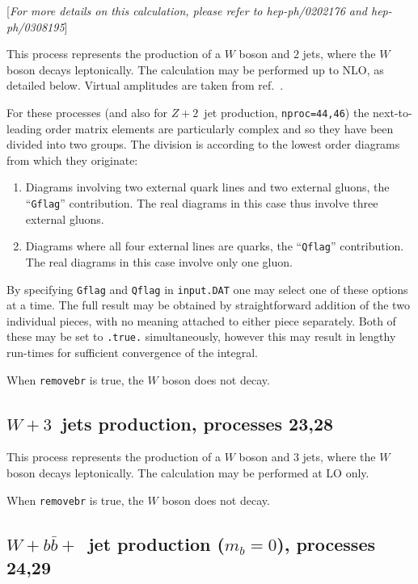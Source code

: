 \documentclass{article}
\begin{document}
\begin{center}
[{\it For more details on this calculation, please refer to \break
 hep-ph/0202176 and hep-ph/0308195}]
\end{center}
This process represents the production of a $W$ boson and $2$ jets,
where the $W$ boson decays leptonically. The calculation may be
performed up to NLO, as detailed below. Virtual amplitudes are
taken from ref.~\cite{Bern:1997sc}.

For these processes (and also for $Z+2$~jet production, {\tt nproc=44,46})
the next-to-leading order matrix elements are
particularly complex and so they have been divided into two groups.
The division is according to the lowest order diagrams from which they
originate:
\begin{enumerate}
\item Diagrams involving two external quark lines and two external gluons,
the ``{\tt Gflag}'' contribution. The real diagrams in this case thus
involve three external gluons.

\item Diagrams where all four external lines are quarks,
the ``{\tt Qflag}'' contribution. The real diagrams in this case 
involve only one gluon.
\end{enumerate}

By specifying {\tt Gflag} and {\tt Qflag} in {\tt input.DAT} one may
select one of these options at a time. The full result may be obtained
by straightforward addition of the two individual pieces, with no
meaning attached to either piece separately. 
Both of these may be set to {\tt .true.} simultaneously, however this
may result in lengthy run-times for sufficient convergence of the integral.

When {\tt removebr} is true, the $W$ boson does not decay.

\subsection{$W+3$~jets production, processes 23,28}
\label{subsec:w3jets}

This process represents the production of a $W$ boson and $3$ jets,
where the $W$ boson decays leptonically. The calculation may be
performed at LO only.

When {\tt removebr} is true, the $W$ boson does not decay.

\subsection{$W+b{\bar b}+$~jet production ($m_b=0$), processes 24,29}
\label{subsec:wbbjetmassless}
\end{document}
